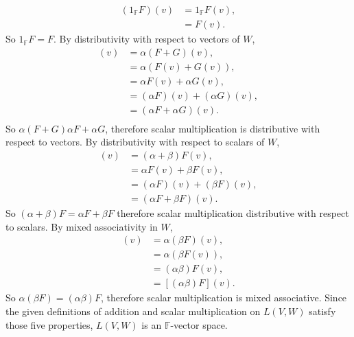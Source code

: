 \documentclass[12pt]{article}
\newcommand{\F}{\mathbb{F}}
\begin{document}
\begin{align*}
    (1_\F F)(v)     &= 1_\F F(v), \\
                    &= F(v).
\end{align*}
So $1_\F F = F$. By distributivity with respect to vectors of $W$,
\begin{align*}
    [\alpha(F + G)](v)  &= \alpha(F+G)(v), \\
                        &= \alpha(F(v) + G(v)), \\
                        &= \alpha F(v) + \alpha G(v), \\
                        &= (\alpha F)(v) + (\alpha G)(v), \\
                        &= (\alpha F + \alpha G)(v).\\
\end{align*}
So $\alpha(F+G) \alpha F + \alpha G$, therefore scalar multiplication is distributive with respect to vectors. By distributivity with respect to scalars of $W$,
\begin{align*}
    [(\alpha + \beta)F](v)  &= (\alpha + \beta)F(v), \\
                            &= \alpha F(v) + \beta F(v), \\
                            &= (\alpha F)(v) + (\beta F)(v), \\
                            &= (\alpha F + \beta F)(v).
\end{align*}
So $(\alpha + \beta)F = \alpha F + \beta F$ therefore scalar multiplication distributive with respect to scalars. By mixed associativity in $W$,
\begin{align*}
    [\alpha(\beta F)](v)    &= \alpha(\beta F)(v), \\
                            &= \alpha(\beta F(v)), \\
                            &= (\alpha \beta)F(v), \\
                            &= [(\alpha\beta)F](v).
\end{align*}
So $\alpha(\beta F) = (\alpha\beta)F$, therefore scalar multiplication is mixed associative. Since the given definitions of addition and scalar multiplication on $L(V,W)$ satisfy those five properties, $L(V,W)$ is an $\F$-vector space.
\end{document}

